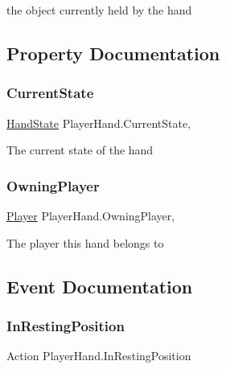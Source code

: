 the object currently held by the hand 



\subsection{Property Documentation}
\mbox{\label{class_player_hand_a6eb1eff28793294622f4037a0aa7afeb}} 
\subsubsection{\texorpdfstring{Current\+State}{CurrentState}}
{\footnotesize\ttfamily \mbox{\hyperlink{class_player_hand_a1af76750da713cbc88856161d8d5ac0e}{Hand\+State}} Player\+Hand.\+Current\+State\hspace{0.3cm}{\ttfamily [get]}, {}}



The current state of the hand 

\mbox{\label{class_player_hand_a0d33095483c291ac3dd5b5350974b626}} 
\subsubsection{\texorpdfstring{Owning\+Player}{OwningPlayer}}
{\footnotesize\ttfamily \mbox{\hyperlink{class_player}{Player}} Player\+Hand.\+Owning\+Player\hspace{0.3cm}{\ttfamily [get]}, {\ttfamily [set]}}



The player this hand belongs to 



\subsection{Event Documentation}
\mbox{\label{class_player_hand_a3a8432e3dbd04a1c12c95ca0c0fd186b}} 
\subsubsection{\texorpdfstring{In\+Resting\+Position}{InRestingPosition}}
{\footnotesize\ttfamily Action Player\+Hand.\+In\+Resting\+Position}



